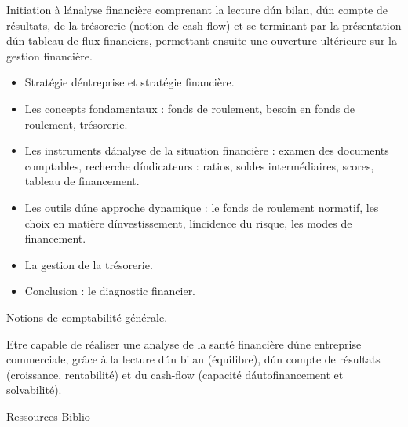 {
Initiation à l\'analyse financière comprenant la lecture d\'un bilan, d\'un
compte de résultats, de la trésorerie (notion de cash-flow) et se terminant
par la présentation d\'un tableau de flux financiers, permettant ensuite une
ouverture ultérieure sur la gestion financière.
\begin{itemize} 
\item Stratégie d\'entreprise et stratégie financière.
\item Les concepts fondamentaux : fonds de roulement, besoin en fonds de roulement, trésorerie.
\item Les instruments d\'analyse de la situation financière : examen des documents comptables, recherche d\'indicateurs : ratios, soldes intermédiaires, scores, tableau de financement.
\item Les outils d\'une approche dynamique : le fonds de roulement normatif,
les choix en matière d\'investissement, l\'incidence du risque, les modes de financement.
\item La gestion de la trésorerie.
\item Conclusion : le diagnostic financier.
\end{itemize} 
} 
{Notions de comptabilité générale.} 
{\begin{itemize} 
  \ObjItem Etre capable de réaliser une analyse de la santé financière d\'une entreprise
commerciale, grâce à la lecture d\'un bilan (équilibre), d\'un compte de
résultats (croissance, rentabilité) et du cash-flow (capacité
d\'autofinancement et solvabilité).
\end{itemize} 
} 
{Ressources} 
{Biblio} 
 
\vfill

